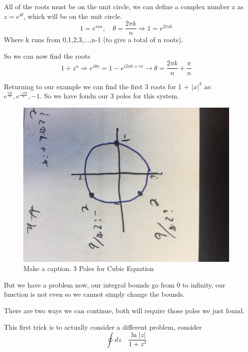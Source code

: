 \documentclass{article}
\newcommand{\be}{\begin{equation}}
\newcommand{\ee}{\end{equation}}
\begin{document}
All of the roots must be on the unit circle, we can define a complex number z as $z=e^{i\theta}$, which will be on the unit circle. 
\be
1 = e^{ian}, \quad \theta = \frac{2\pi k}{n} \Rightarrow 1 = e^{2\pi ik}
\ee
Where k runs from 0,1,2,3,...,n-1 (to give a total of n roots). 

So we can now find the roots
\be
1+z^n \Rightarrow e^{i\theta n} = 1 - e^{i2\pi k + i\pi} \rightarrow \theta = \frac{2\pi k}{n} + \frac{\pi}{n}
\ee

Returning to our example we can find the first 3 roots for 1 + $|x|^3$ as:  $e^{\frac{i2\pi}{6}}, e^{\frac{-i2\pi}{6}}, -1 $.
So we have foudn our 3 poles for this system. 
\begin{figure}[H]
  \centering
    \includegraphics[scale=0.2]{Figures/poles.png}
    \caption{Make a caption. 3 Poles for Cubic Equation}
\end{figure}

But we have a problem now, our integral bounds go from 0 to infinity, our function is not even so we cannot simply change the bounds.

There are two ways we can continue, both will require those poles we just found. 

This first trick is to actually consider a different problem, consider
\be
\oint dz \quad \frac{\ln|z|}{1+z^3}
\ee
\end{document}

